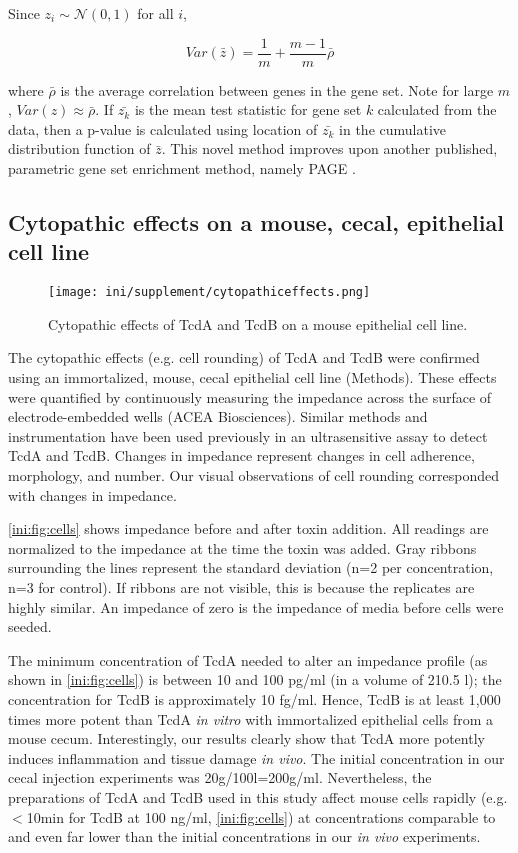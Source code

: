 Since $z_i \sim \mathcal{N}(0,1)$ for all $i$,

\begin{equation}
Var( \bar{z} ) = \frac{1}{m}  + \frac{m-1}{m}\bar{\rho}
\end{equation}

where $\bar{\rho}$ is the average correlation between genes in the gene set. Note for
large $m$, $Var(z) \approx \bar{\rho}$. If $\bar{z_k}$ is the 
mean test statistic for gene set $k$ calculated from the data, then a p-value
is calculated using location of $\bar{z_k}$ in the cumulative distribution 
function of $\bar{z}$. This novel method improves upon another published, parametric gene
set enrichment method, namely PAGE \cite{Kim:2005fw}.


\subsection{Cytopathic effects on a mouse, cecal, epithelial cell line}

\begin{figure}[b!]
\centering
\texttt{[image: ini/supplement/cytopathiceffects.png]}
\caption{Cytopathic effects of TcdA and TcdB on a mouse epithelial cell line.}
\label{ini:fig:cells}
\end{figure}

The cytopathic effects (e.g. cell rounding) of TcdA and TcdB were confirmed using an
immortalized, mouse, cecal epithelial cell line (Methods). These effects
were quantified by continuously measuring the impedance across the surface
of electrode-embedded wells (ACEA Biosciences). Similar methods and instrumentation
have been used previously in an ultrasensitive assay to detect TcdA and TcdB. \cite{He:2009hg} 
Changes in impedance represent changes in
cell adherence, morphology, and number. Our visual observations of cell rounding
corresponded with changes in impedance. 

\autoref{ini:fig:cells} shows impedance before and after toxin
addition. All readings are normalized to the impedance
at the time the toxin was added. Gray ribbons surrounding the lines represent
the standard deviation (n=2 per concentration, n=3 for control). If ribbons are not visible, 
this is because the replicates are highly similar. An impedance of zero
is the impedance of media before cells were seeded.

The minimum concentration of 
TcdA needed to alter an impedance profile (as shown in \autoref{ini:fig:cells}) is
between 10 and 100 pg/ml (in a volume of 210.5 \textmugreek{}l); the concentration for TcdB is 
approximately 10 fg/ml. 
Hence, TcdB is at least 1,000 times more potent than TcdA
\emph{in vitro} with immortalized epithelial cells from a mouse cecum. Interestingly, our results
clearly show that TcdA more potently induces inflammation and
tissue damage \emph{in vivo}. 
The initial concentration in our cecal injection experiments was 
20\textmugreek{}g/100\textmugreek{}l=200\textmugreek{}g/ml. 
Nevertheless, the preparations of TcdA and TcdB used
in this study affect mouse cells rapidly (e.g. $<$10min for TcdB at 100 ng/ml, 
\autoref{ini:fig:cells}) at concentrations comparable to and even far lower than 
the initial concentrations in our \emph{in vivo} experiments.


